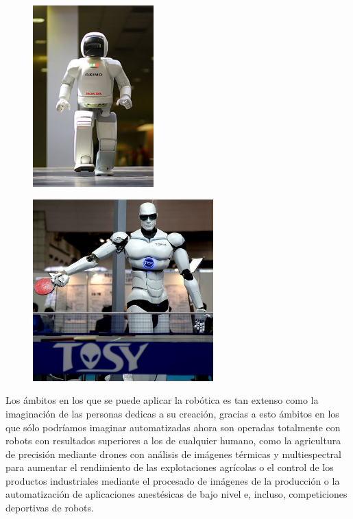 \begin{figure}[h]
	\centering
	\begin{minipage}[h]{.48\linewidth}
		\centering
		\includegraphics[width=.5\linewidth, height=7cm]{figures/asimo.png}
		\label{fig:asimo}
	\end{minipage}
	\begin{minipage}[h]{.48\linewidth}
		\centering
		\includegraphics[width=.7\linewidth, height=7cm]{figures/topio.jpg}
		\label{fig:topio}
	\end{minipage}
\end{figure}

Los ámbitos en los que se puede aplicar la robótica es tan extenso como la imaginación de las personas dedicas a su creación, gracias a esto ámbitos en los que sólo podríamos imaginar automatizadas ahora son operadas totalmente con robots con resultados superiores a los de cualquier humano, como la agricultura de precisión mediante drones con análisis de imágenes térmicas y multiespectral para aumentar el rendimiento de las explotaciones agrícolas o el control de los productos industriales mediante el procesado de imágenes de la producción o la automatización de aplicaciones anestésicas de bajo nivel e, incluso, competiciones deportivas de robots.

